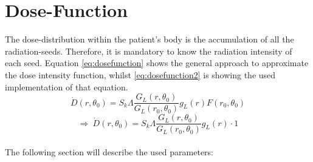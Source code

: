 \documentclass[12pt]{article}
\begin{document}
\section{Dose-Function}\label{dose_function}
The dose-distribution within the patient's body is the accumulation of all the radiation-seeds. Therefore, it is mandatory to know the radiation intensity of each seed. Equation \eqref{eq:dosefunction} shows the general approach to approximate the dose intensity function, whilst \eqref{eq:dosefunction2} is showing the used implementation of that equation.
\begin{equation}
\label{eq:dosefunction}
\dot{D}(r,\theta_{0})= S_{k}\Lambda \frac{G_{L}(r,\theta_{0})}{G_{L}(r_{0},\theta_{0})} g_{L}(r) F(r_{0},\theta_{0})
\end{equation}
\begin{equation}
\label{eq:dosefunction2}
\Rightarrow \ \dot{D}(r,\theta_{0})= S_{k}\Lambda \frac{G_{L}(r,\theta_{0})}{G_{L}(r_{0},\theta_{0})} g_{L}(r) \cdot 1
\end{equation}
\\
The following section will describe the used parameters:
\end{document}
